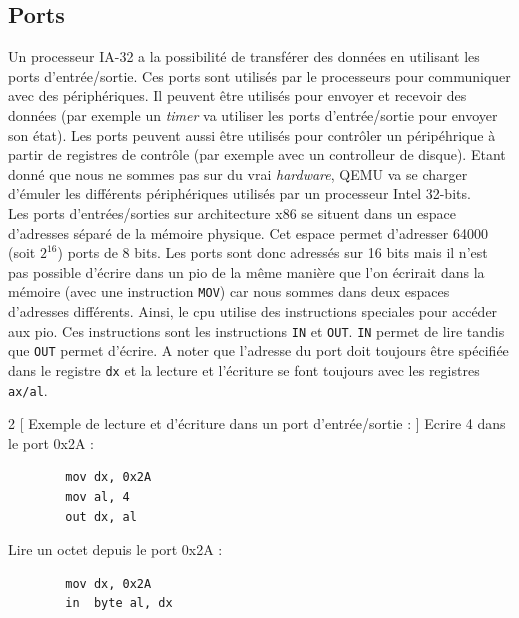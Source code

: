 
\subsection{Ports}
Un processeur \acrshort{IA-32} a la possibilité de transférer des données en utilisant
les ports d'entrée/sortie. Ces ports sont utilisés par le processeurs pour communiquer
avec des périphériques. Il peuvent être utilisés pour envoyer et recevoir des données
(par exemple un \textit{timer} va utiliser les ports d'entrée/sortie pour envoyer
son état). Les ports peuvent aussi être utilisés pour contrôler un péripéhrique
à partir de registres de contrôle (par exemple avec un controlleur de disque).\cite{ref64}
Etant donné que nous ne sommes pas sur du vrai \textit{hardware}, QEMU va se charger
d'émuler les différents périphériques utilisés par un processeur Intel 32-bits. \\

Les ports d'entrées/sorties sur architecture x86 se situent dans un espace d'adresses
séparé de la mémoire physique. Cet espace permet d'adresser 64000 (soit $2^{16}$)
ports de 8 bits. Les ports sont donc adressés sur 16 bits mais  il n'est pas possible
d'écrire dans un \acrshort{pio} de la même manière que l'on écrirait dans la mémoire
(avec une instruction  \texttt{MOV}) car nous sommes dans deux
espaces d'adresses différents. Ainsi, le \acrshort{cpu} utilise des instructions speciales
pour accéder aux \acrshort{pio}. Ces instructions sont les instructions
\texttt{IN} et \texttt{OUT}. \texttt{IN} permet de lire
tandis que \texttt{OUT} permet d'écrire. A noter que l'adresse du port
doit toujours être spécifiée dans le registre \texttt{dx} et la lecture
et l'écriture se font toujours avec les registres \texttt{ax/al}.\cite{ref42} \\

\begin{multicols}{2}
    [
    Exemple de lecture et d'écriture dans un port d'entrée/sortie :
    ]
    Ecrire 4 dans le port 0x2A :
    \begin{verbatim}
        mov dx, 0x2A
        mov al, 4
        out dx, al
    \end{verbatim}
    \columnbreak
    Lire un octet depuis le port 0x2A :
    \begin{verbatim}
        mov dx, 0x2A
        in  byte al, dx
    \end{verbatim}
\end{multicols}

